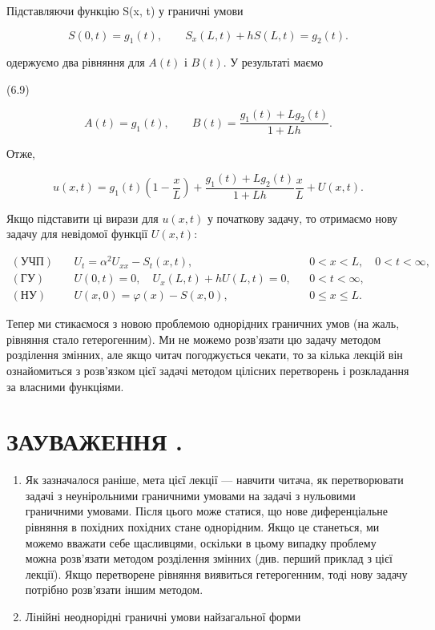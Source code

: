 Підставляючи функцію S(x, t) у граничні умови

\[
S(0, t)=g_1(t), \qquad S_x(L, t)+hS(L, t)=g_2(t).
\]

одержуємо два рівняння для \(A(t)\) і \(B(t)\). У результаті маємо

(6.9)

\[
A(t)=g_1(t), \qquad B(t)=\frac{g_1(t)+Lg_2(t)}{1+Lh}.
\]

Отже,

\[
u(x, t)=g_1(t)\left(1-\frac{x}{L}\right)+\frac{g_1(t)+Lg_2(t)}{1+Lh}\frac{x}{L}+U(x, t).
\]

Якщо підставити ці вирази для \(u(x,t)\) у початкову задачу, то отримаємо нову задачу для невідомої функції \(U(x,t)\):

\[
\begin{aligned}
(\text{УЧП})\quad & U_t = \alpha^2 U_{xx} - S_t(x,t), && 0 < x < L,\quad 0 < t < \infty, \\
(\text{ГУ})\quad & U(0,t) = 0,\quad U_x(L,t) + hU(L,t) = 0, && 0 < t < \infty, \\
(\text{НУ})\quad & U(x,0) = \varphi(x) - S(x,0), && 0 \leqslant x \leqslant L.
\end{aligned}
\]

Тепер ми стикаємося з новою проблемою однорідних граничних умов (на жаль, рівняння стало гетерогенним). Ми не можемо розв'язати цю задачу методом розділення змінних, але якщо читач погоджується чекати, то за кілька лекцій він ознайомиться з розв'язком цієї задачі методом цілісних перетворень і розкладання за власними функціями.

\section{ЗАУВАЖЕННЯ .}\label{ux437ux430ux443ux432ux430ux436ux435ux43dux43dux44f-.}

\begin{enumerate}
\def\labelenumi{\arabic{enumi}.}
\item
  Як зазначалося раніше, мета цієї лекції --- навчити читача, як перетворювати задачі з неунірольними граничними умовами на задачі з нульовими граничними умовами. Після цього може статися, що нове диференціальне рівняння в похідних похідних стане однорідним. Якщо це станеться, ми можемо вважати себе щасливцями, оскільки в цьому випадку проблему можна розв'язати методом розділення змінних (див. перший приклад з цієї лекції). Якщо перетворене рівняння виявиться гетерогенним, тоді нову задачу потрібно розв'язати іншим методом.
\item
  Лінійні неоднорідні граничні умови найзагальної форми
\end{enumerate}


